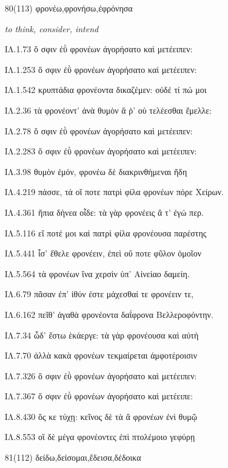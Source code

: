 \begin{enumerate}
{ΙΛ.19.19 αὐτὰρ ἐπεὶ φρεσὶν ᾗσι τετάρπετο δαίδαλα λεύσσων 

}

\clearpage
\item[\large 80(113)]{\large \g φρονέω,φρονήσω,ἐφρόνησα}

\hspace{0.2cm} \textit{ to think, consider, intend }

{\g
ΙΛ.1.73 ὅ σφιν ἐῢ φρονέων ἀγορήσατο καὶ μετέειπεν: 

ΙΛ.1.253 ὅ σφιν ἐῢ φρονέων ἀγορήσατο καὶ μετέειπεν: 

ΙΛ.1.542 κρυπτάδια φρονέοντα δικαζέμεν: οὐδέ τί πώ μοι 

ΙΛ.2.36 τὰ φρονέοντ' ἀνὰ θυμὸν ἅ ῥ' οὐ τελέεσθαι ἔμελλε: 

ΙΛ.2.78 ὅ σφιν ἐῢ φρονέων ἀγορήσατο καὶ μετέειπεν: 

ΙΛ.2.283 ὅ σφιν ἐῢ φρονέων ἀγορήσατο καὶ μετέειπεν: 

ΙΛ.3.98 θυμὸν ἐμόν, φρονέω δὲ διακρινθήμεναι ἤδη 

ΙΛ.4.219 πάσσε, τά οἵ ποτε πατρὶ φίλα φρονέων πόρε Χείρων. 

ΙΛ.4.361 ἤπια δήνεα οἶδε: τὰ γὰρ φρονέεις ἅ τ' ἐγώ περ. 

ΙΛ.5.116 εἴ ποτέ μοι καὶ πατρὶ φίλα φρονέουσα παρέστης 

ΙΛ.5.441 ἶσ' ἔθελε φρονέειν, ἐπεὶ οὔ ποτε φῦλον ὁμοῖον 

ΙΛ.5.564 τὰ φρονέων ἵνα χερσὶν ὑπ' Αἰνείαο δαμείη. 

ΙΛ.6.79 πᾶσαν ἐπ' ἰθύν ἐστε μάχεσθαί τε φρονέειν τε, 

ΙΛ.6.162 πεῖθ' ἀγαθὰ φρονέοντα δαΐφρονα Βελλεροφόντην. 

ΙΛ.7.34 ὧδ' ἔστω ἑκάεργε: τὰ γὰρ φρονέουσα καὶ αὐτὴ 

ΙΛ.7.70 ἀλλὰ κακὰ φρονέων τεκμαίρεται ἀμφοτέροισιν 

ΙΛ.7.326 ὅ σφιν ἐῢ φρονέων ἀγορήσατο καὶ μετέειπεν: 

ΙΛ.7.367 ὅ σφιν ἐῢ φρονέων ἀγορήσατο καὶ μετέειπε: 

ΙΛ.8.430 ὅς κε τύχῃ: κεῖνος δὲ τὰ ἃ φρονέων ἐνὶ θυμῷ 

ΙΛ.8.553 οἳ δὲ μέγα φρονέοντες ἐπὶ πτολέμοιο γεφύρῃ 

}

\clearpage
\item[\large 81(112)]{\large \g δείδω,δεἰσομαι,ἔδεισα,δέδοικα	}


\end{enumerate}

